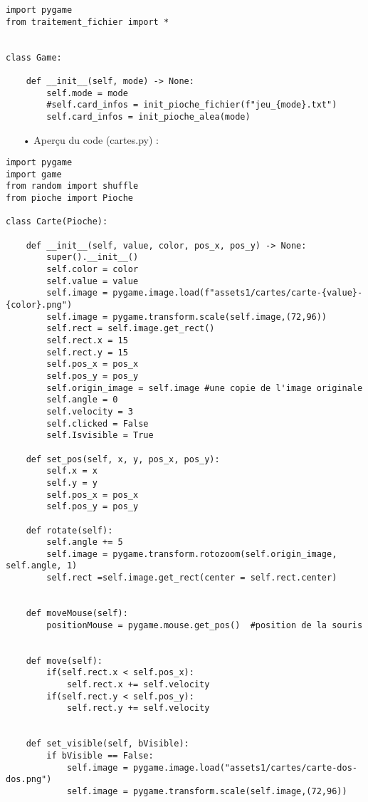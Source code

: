 	\begin{lstlisting}
import pygame
from traitement_fichier import *


class Game:

    def __init__(self, mode) -> None:
        self.mode = mode
        #self.card_infos = init_pioche_fichier(f"jeu_{mode}.txt")
        self.card_infos = init_pioche_alea(mode)
	\end{lstlisting}

	\begin{itemize}
	\color{blue}\item[•]Aperçu du code (cartes.py) :
	\end{itemize}
	
	\begin{lstlisting}
import pygame
import game
from random import shuffle
from pioche import Pioche

class Carte(Pioche):

    def __init__(self, value, color, pos_x, pos_y) -> None:
        super().__init__()
        self.color = color
        self.value = value
        self.image = pygame.image.load(f"assets1/cartes/carte-{value}-{color}.png")
        self.image = pygame.transform.scale(self.image,(72,96))
        self.rect = self.image.get_rect()
        self.rect.x = 15
        self.rect.y = 15
        self.pos_x = pos_x
        self.pos_y = pos_y
        self.origin_image = self.image #une copie de l'image originale
        self.angle = 0
        self.velocity = 3
        self.clicked = False
        self.Isvisible = True
    
    def set_pos(self, x, y, pos_x, pos_y):
        self.x = x 
        self.y = y
        self.pos_x = pos_x
        self.pos_y = pos_y

    def rotate(self):
        self.angle += 5
        self.image = pygame.transform.rotozoom(self.origin_image, self.angle, 1)
        self.rect =self.image.get_rect(center = self.rect.center)


    def moveMouse(self):
        positionMouse = pygame.mouse.get_pos()  #position de la souris
        

    def move(self):
        if(self.rect.x < self.pos_x):
            self.rect.x += self.velocity
        if(self.rect.y < self.pos_y):
            self.rect.y += self.velocity


    def set_visible(self, bVisible):
        if bVisible == False:
            self.image = pygame.image.load("assets1/cartes/carte-dos-dos.png")
            self.image = pygame.transform.scale(self.image,(72,96))

	\end{lstlisting}

